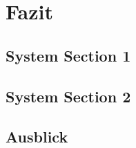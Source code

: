 %
\chapter{Fazit}
\label{sec:Fazit}


\section{System Section 1}
\label{sec:Fazit:sec1}


\section{System Section 2}
\label{sec:Fazit:sec2}


\section{Ausblick}
\label{sec:Fazit:Ausblick}

